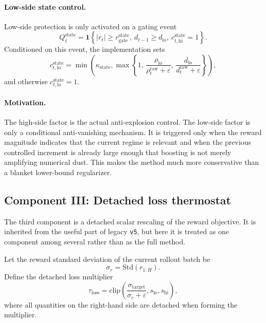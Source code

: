 \documentclass[11pt]{article}
\newcommand{\1}{\mathbf{1}}
\newcommand{\abs}[1]{\left\lvert #1 \right\rvert}
\begin{document}
\paragraph{Low-side state control.}
Low-side protection is only activated on a gating event
\begin{equation}
  Q_t^{\mathrm{state}}
  =
  \1\!\left\{
    \abs{r_t} \ge r_{\mathrm{gate}}^{\mathrm{state}},
    \ d_{t-1} \ge d_{\mathrm{lo}},
    \ c_{t,\mathrm{hi}}^{\mathrm{state}} = 1
  \right\}.
\end{equation}
Conditioned on this event, the implementation sets
\begin{equation}
  c_{t,\mathrm{lo}}^{\mathrm{state}}
  =
  \min\!\left(
    \kappa_{\mathrm{state}},
    \max\!\left\{
      1,\,
      \frac{\rho_{\mathrm{lo}}}{\rho_t^{\mathrm{raw}} + \varepsilon},\,
      \frac{d_{\mathrm{lo}}}{d_t^{\mathrm{raw}} + \varepsilon}
    \right\}
  \right),
\end{equation}
and otherwise $c_{t,\mathrm{lo}}^{\mathrm{state}} = 1$.

\paragraph{Motivation.}
The high-side factor is the actual anti-explosion control. The low-side factor is only a conditional anti-vanishing mechanism. It is triggered only when the reward magnitude indicates that the current regime is relevant and when the previous controlled increment is already large enough that boosting is not merely amplifying numerical dust. This makes the method much more conservative than a blanket lower-bound regularizer.

\subsection{Component III: Detached loss thermostat}
The third component is a detached scalar rescaling of the reward objective. It is inherited from the useful part of legacy \texttt{v5}, but here it is treated as one component among several rather than as the full method.

Let the reward standard deviation of the current rollout batch be
\begin{equation}
  \sigma_r = \mathrm{Std}(r_{1:H}).
\end{equation}
Define the detached loss multiplier
\begin{equation}
  \tau_{\mathrm{loss}}
  =
  \mathrm{clip}\!\left(
    \frac{\sigma_{\mathrm{target}}}{\sigma_r + \varepsilon},
    s_{\mathrm{lo}},
    s_{\mathrm{hi}}
  \right),
\end{equation}
where all quantities on the right-hand side are detached when forming the multiplier.
\end{document}
